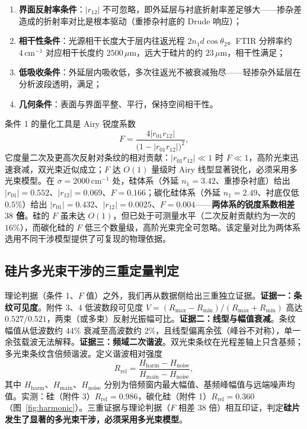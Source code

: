 \documentclass[11pt,a4paper,fontset=fandol]{ctexart}
\newcommand{\um}{\,\mu\mathrm{m}}
\newcommand{\invcm}{\,\mathrm{cm^{-1}}}
\begin{document}
\begin{enumerate}[label=\textbf{条件\arabic*：}, leftmargin=3.6em, itemsep=0.15em]
    \item \textbf{界面反射率条件}：$|r_{12}|$ 不可忽略，即外延层与衬底折射率差足够大——掺杂差造成的折射率对比是根本驱动（重掺杂衬底的 Drude 响应\cite{spitzer1957}）；
    \item \textbf{相干性条件}：光源相干长度大于层内往返光程 $2n_1d\cos\theta_2$。FTIR 分辨率约 $4\invcm$ 对应相干长度约 $2500\um$，远大于硅片的约 $23\um$，相干性满足；
    \item \textbf{低吸收条件}：外延层内吸收低，多次往返光不被衰减殆尽——轻掺杂外延层在分析波段透明，满足；
    \item \textbf{几何条件}：表面与界面平整、平行，保持空间相干性。
\end{enumerate}

条件 1 的量化工具是 Airy 锐度系数\cite{zhu2026,born1999}
\begin{equation}
    F = \frac{4|r_{01}r_{12}|}{\bigl(1-|r_{01}r_{12}|\bigr)^{2}},
    \label{eq:finesse}
\end{equation}
它度量二次及更高次反射对条纹的相对贡献：$|r_{01}r_{12}|\ll1$ 时 $F\ll1$，高阶光束迅速衰减，双光束近似成立；$F$ 达 $O(1)$ 量级时 Airy 线型显著锐化，必须采用多光束模型。在 $\sigma=2000\invcm$ 处，硅体系（外延 $n_1=3.42$、重掺杂衬底）给出 $|r_{01}|=0.552$、$|r_{12}|=0.069$、$F=0.166$；碳化硅体系（外延 $n_1=2.49$、衬底仅低 $0.5\%$）给出 $|r_{01}|=0.432$、$|r_{12}|=0.0025$、$F=0.004$——\textbf{两体系的锐度系数相差 $38$ 倍}。硅的 $F$ 虽未达 $O(1)$，但已处于可测量水平（二次反射贡献约为一次的 $16\%$），而碳化硅的 $F$ 低三个数量级，高阶光束完全可忽略。该定量对比为两体系选用不同干涉模型提供了可复现的物理依据。

\subsection{硅片多光束干涉的三重定量判定}

理论判据（条件 1、$F$ 值）之外，我们再从数据侧给出三重独立证据。\textbf{证据一：条纹可见度}。附件 3、4 低波数段可见度 $V=(R_{\max}-R_{\min})/(R_{\max}+R_{\min})$ 高达 $0.527/0.521$，两束（或多束）反射光振幅可比。\textbf{证据二：线型与幅值衰减}。条纹幅值从低波数约 $44\%$ 衰减至高波数约 $2\%$，且线型偏离余弦（峰谷不对称），单一余弦载波无法解释。\textbf{证据三：频域二次谐波}。双光束条纹在光程差轴上只含基频；多光束条纹含倍频谐波。定义谐波相对强度
\begin{equation}
    R_{\mathrm{rel}} = \frac{H_{\mathrm{harm}}-H_{\mathrm{noise}}}{H_{\mathrm{main}}-H_{\mathrm{noise}}},
    \label{eq:harmonic}
\end{equation}
其中 $H_{\mathrm{harm}}$、$H_{\mathrm{main}}$、$H_{\mathrm{noise}}$ 分别为倍频窗内最大幅值、基频峰幅值与远端噪声均值\cite{linjk2026}。实测：硅（附件 3）$R_{\mathrm{rel}}=0.986$，碳化硅（附件 1）$R_{\mathrm{rel}}=0.360$（图~\ref{fig:harmonic}）。三重证据与理论判据（$F$ 相差 $38$ 倍）相互印证，判定\textbf{硅片发生了显著的多光束干涉，必须采用多光束模型}。
\end{document}
